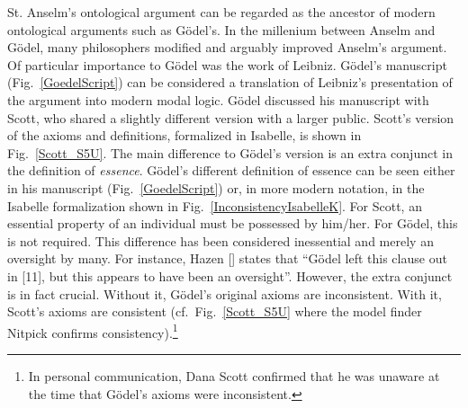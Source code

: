 \documentclass{article}
\begin{document}
St. Anselm's ontological argument \cite{Proslogion} can be regarded as
the ancestor of modern ontological arguments such as G\"odel's. In the
millenium between Anselm and G\"odel, many philosophers modified and
arguably improved Anselm's argument. Of particular importance to
G\"odel was the work of Leibniz. 
G\"odel's manuscript
(Fig.~\ref{GoedelScript}) can be considered a translation of Leibniz's
presentation of the argument into modern modal logic. G\"odel
discussed his manuscript with Scott, who shared a slightly different
version with a larger public. Scott's version of the axioms and
definitions, formalized in Isabelle, is shown in
Fig.~\ref{Scott_S5U}. The main difference to G\"odel's version is an extra conjunct in the definition of \emph{essence}. G\"odel's
different definition of essence can be seen either in his manuscript
(Fig.~\ref{GoedelScript}) or, in more modern notation, in the Isabelle
formalization shown in Fig.~\ref{InconsistencyIsabelleK}. For Scott,
an essential property of an individual must be possessed by
him/her. For G\"odel, this is not required. This difference has been
considered inessential and merely an oversight by many. For instance,
Hazen [\citeyear[p.365]{Hazen}] states that ``G\"odel left this
clause out in [11], but this appears to have been an oversight''.
However, the extra conjunct is in
fact crucial. Without it, G\"odel's original axioms are
inconsistent. With it, Scott's axioms are consistent (cf.~Fig.~\ref{Scott_S5U}
where the model finder Nitpick \cite{Nitpick} confirms consistency).\footnote{In
  personal communication, Dana Scott confirmed that he was unaware
  at the time that G\"odel's axioms were inconsistent.}
\end{document}
